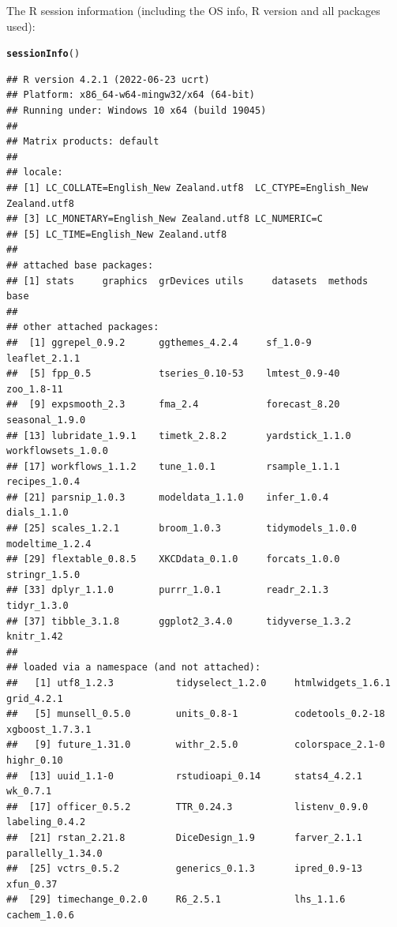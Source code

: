 \documentclass{article}\usepackage[]{graphicx}\usepackage[]{xcolor}
\makeatletter
\newcommand{\hlstd}[1]{\textcolor[rgb]{0.345,0.345,0.345}{#1}}%
\newcommand{\hlkwd}[1]{\textcolor[rgb]{0.737,0.353,0.396}{\textbf{#1}}}%
\newenvironment{kframe}{%
 \def\at@end@of@kframe{}%
 \ifinner\ifhmode%
  \def\at@end@of@kframe{\end{minipage}}%
  \begin{minipage}{\columnwidth}%
 \fi\fi%
 \def\FrameCommand##1{\hskip\@totalleftmargin \hskip-\fboxsep
 \colorbox{shadecolor}{##1}\hskip-\fboxsep
     \hskip-\linewidth \hskip-\@totalleftmargin \hskip\columnwidth}%
 \MakeFramed {\advance\hsize-\width
   \@totalleftmargin\z@ \linewidth\hsize
   \@setminipage}}%
 {\par\unskip\endMakeFramed%
 \at@end@of@kframe}
\newenvironment{knitrout}{}{} %
\makeatother
\begin{document}
The R session information (including the OS info, R version and all
packages used):

\begin{knitrout}
\color{fgcolor}\begin{kframe}
\begin{alltt}
\hlkwd{sessionInfo}\hlstd{()}
\end{alltt}
\begin{verbatim}
## R version 4.2.1 (2022-06-23 ucrt)
## Platform: x86_64-w64-mingw32/x64 (64-bit)
## Running under: Windows 10 x64 (build 19045)
## 
## Matrix products: default
## 
## locale:
## [1] LC_COLLATE=English_New Zealand.utf8  LC_CTYPE=English_New Zealand.utf8   
## [3] LC_MONETARY=English_New Zealand.utf8 LC_NUMERIC=C                        
## [5] LC_TIME=English_New Zealand.utf8    
## 
## attached base packages:
## [1] stats     graphics  grDevices utils     datasets  methods   base     
## 
## other attached packages:
##  [1] ggrepel_0.9.2      ggthemes_4.2.4     sf_1.0-9           leaflet_2.1.1     
##  [5] fpp_0.5            tseries_0.10-53    lmtest_0.9-40      zoo_1.8-11        
##  [9] expsmooth_2.3      fma_2.4            forecast_8.20      seasonal_1.9.0    
## [13] lubridate_1.9.1    timetk_2.8.2       yardstick_1.1.0    workflowsets_1.0.0
## [17] workflows_1.1.2    tune_1.0.1         rsample_1.1.1      recipes_1.0.4     
## [21] parsnip_1.0.3      modeldata_1.1.0    infer_1.0.4        dials_1.1.0       
## [25] scales_1.2.1       broom_1.0.3        tidymodels_1.0.0   modeltime_1.2.4   
## [29] flextable_0.8.5    XKCDdata_0.1.0     forcats_1.0.0      stringr_1.5.0     
## [33] dplyr_1.1.0        purrr_1.0.1        readr_2.1.3        tidyr_1.3.0       
## [37] tibble_3.1.8       ggplot2_3.4.0      tidyverse_1.3.2    knitr_1.42        
## 
## loaded via a namespace (and not attached):
##   [1] utf8_1.2.3           tidyselect_1.2.0     htmlwidgets_1.6.1    grid_4.2.1          
##   [5] munsell_0.5.0        units_0.8-1          codetools_0.2-18     xgboost_1.7.3.1     
##   [9] future_1.31.0        withr_2.5.0          colorspace_2.1-0     highr_0.10          
##  [13] uuid_1.1-0           rstudioapi_0.14      stats4_4.2.1         wk_0.7.1            
##  [17] officer_0.5.2        TTR_0.24.3           listenv_0.9.0        labeling_0.4.2      
##  [21] rstan_2.21.8         DiceDesign_1.9       farver_2.1.1         parallelly_1.34.0   
##  [25] vctrs_0.5.2          generics_0.1.3       ipred_0.9-13         xfun_0.37           
##  [29] timechange_0.2.0     R6_2.5.1             lhs_1.1.6            cachem_1.0.6        

\end{verbatim}
\end{kframe}
\end{knitrout}
\end{document}
